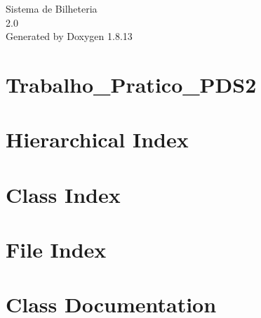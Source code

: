 \documentclass[twoside]{book}
\newcommand{\+}{\discretionary{\mbox{\scriptsize$\hookleftarrow$}}{}{}}
\newcommand{\clearemptydoublepage}{%
  \newpage{\pagestyle{empty}\cleardoublepage}%
}
\begin{document}
\hypersetup{pageanchor=false,
             bookmarksnumbered=true,
             pdfencoding=unicode
            }
\begin{titlepage}
\vspace*{7cm}
\begin{center}%
{\Large Sistema de Bilheteria \\[1ex]\large 2.\+0 }\\
\vspace*{1cm}
{\large Generated by Doxygen 1.8.13}\\
\end{center}
\end{titlepage}
\clearemptydoublepage
{}
\tableofcontents
\clearemptydoublepage
{}
\hypersetup{pageanchor=true}

\chapter{Trabalho\+\_\+\+Pratico\+\_\+\+P\+D\+S2}
\label{md__r_e_a_d_m_e}

\chapter{Hierarchical Index}

\chapter{Class Index}

\chapter{File Index}

\chapter{Class Documentation}






















\end{document}
